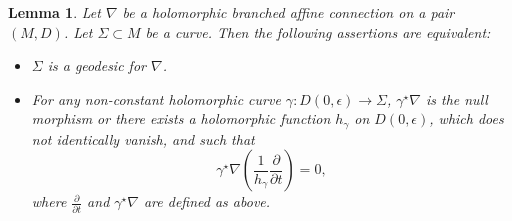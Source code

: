 \documentclass[pdftex]{sigma}
\newcommand{\der}[2]{\frac{\partial #1}{\partial#2}}
\numberwithin{equation}{section}
\newtheorem{Lemma}[Theorem]{Lemma}
\begin{document}
\begin{Lemma}\label{caracterisationbranchedgeodesics} Let $\nabla$ be a holomorphic branched affine connection on a pair $(M,D)$. Let $\Sigma \subset M$ be a curve. Then the following assertions are equivalent:
 \begin{itemize}\itemsep=0pt
 \item[$(i)$] $\Sigma$ is a geodesic for $\nabla$.
\item[$(ii)$] For any non-constant holomorphic curve $\gamma\colon D(0,\epsilon) \longrightarrow \Sigma$, $\gamma^\star \nabla$ is the null morphism or there exists a holomorphic function $h_\gamma$ on $D(0,\epsilon)$, which does not identically vanish, and such that
\[\gamma^\star \nabla\left(\frac{1}{h_\gamma} \der{}{t}\right) =0,\]
 where $\der{}{t}$ and $\gamma^\star \nabla$ are defined as above.
 \end{itemize}\end{Lemma}
\end{document}
